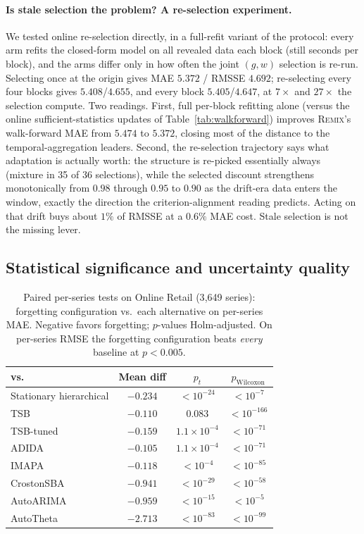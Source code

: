 \documentclass[twocolumn,10pt]{article}
\newcommand{\REMIX}{\textsc{Remix}}
\begin{document}
\paragraph{Is stale selection the problem? A re-selection experiment.}
We tested online re-selection directly, in a full-refit variant of the
protocol: every arm refits the closed-form model on all revealed data
each block (still seconds per block), and the arms differ only in how
often the joint $(g,w)$ selection is re-run. Selecting once at the
origin gives MAE $5.372$ / RMSSE $4.692$; re-selecting every four
blocks gives $5.408$/$4.655$, and every block $5.405$/$4.647$, at
$7\times$ and $27\times$ the selection compute. Two readings. First,
full per-block refitting alone (versus the online sufficient-statistics
updates of Table~\ref{tab:walkforward}) improves \REMIX{}'s walk-forward
MAE from $5.474$ to $5.372$, closing most of the distance to the
temporal-aggregation leaders. Second, the re-selection trajectory says
what adaptation is actually worth: the structure is re-picked
essentially always (mixture in 35 of 36 selections), while the selected
discount strengthens monotonically from $0.98$ through $0.95$ to $0.90$
as the drift-era data enters the window, exactly the direction the
criterion-alignment reading predicts. Acting on that drift buys about
$1\%$ of RMSSE at a $0.6\%$ MAE cost. Stale selection is not the
missing lever.

\subsection{Statistical significance and uncertainty quality}
\label{sec:significance}

\begin{table}[t]
\centering
\caption{Paired per-series tests on Online Retail (3{,}649 series):
forgetting configuration vs.\ each alternative on per-series MAE.
Negative favors forgetting; $p$-values Holm-adjusted. On per-series RMSE
the forgetting configuration beats \emph{every} baseline at $p<0.005$.}
\label{tab:significance}
\small
\setlength{\tabcolsep}{5pt}
\begin{tabular}{lccc}
\toprule
vs. & Mean diff & $p_t$ & $p_{\mathrm{Wilcoxon}}$\\
\midrule
Stationary hierarchical & $-0.234$ & $<\!10^{-24}$ & $<\!10^{-7}$\\
TSB & $-0.110$ & $0.083$ & $<\!10^{-166}$\\
TSB-tuned & $-0.159$ & $1.1\times10^{-4}$ & $<\!10^{-71}$\\
ADIDA & $-0.105$ & $1.1\times10^{-4}$ & $<\!10^{-71}$\\
IMAPA & $-0.118$ & $<\!10^{-4}$ & $<\!10^{-85}$\\
CrostonSBA & $-0.941$ & $<\!10^{-29}$ & $<\!10^{-58}$\\
AutoARIMA & $-0.959$ & $<\!10^{-15}$ & $<\!10^{-5}$\\
AutoTheta & $-2.713$ & $<\!10^{-83}$ & $<\!10^{-99}$\\
\bottomrule
\end{tabular}
\end{table}
\end{document}
